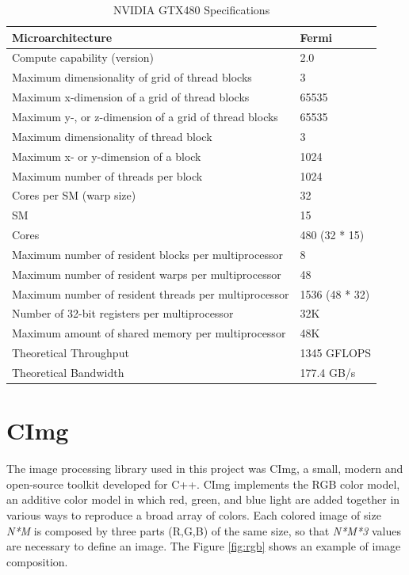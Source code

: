 \documentclass[a4paper]{article}
\begin{document}
\begin{table}[ht]
\centering
\begin{tabular}{l|l}
Microarchitecture & Fermi \\ \hline
Compute capability (version) & 2.0 \\ \hline
Maximum dimensionality of grid of thread blocks & 3 \\ \hline
Maximum x-dimension of a grid of thread blocks & 65535 \\ \hline
Maximum y-, or z-dimension of a grid of thread blocks & 65535 \\ \hline
Maximum dimensionality of thread block & 3 \\ \hline
Maximum x- or y-dimension of a block & 1024 \\ \hline
Maximum number of threads per block & 1024 \\ \hline
Cores per SM (warp size) & 32 \\ \hline
SM & 15 \\ \hline
Cores & 480 (32 * 15) \\ \hline
Maximum number of resident blocks per multiprocessor & 8 \\ \hline
Maximum number of resident warps per multiprocessor & 48 \\ \hline
Maximum number of resident threads per multiprocessor & 1536 (48 * 32) \\ \hline
Number of 32-bit registers per multiprocessor & 32K \\ \hline
Maximum amount of shared memory per multiprocessor & 48K \\ \hline
Theoretical Throughput & 1345 GFLOPS \\ \hline
Theoretical Bandwidth & 177.4 GB/s
\end{tabular}
\caption{NVIDIA GTX480 Specifications}
\label{table:t1}
\end{table}


\section{CImg}
\label{sec:cimg}
The image processing library used in this project was CImg, a small, modern and open-source toolkit developed for C++. CImg implements the RGB color model, an additive color model in which red, green, and blue light are added together in various ways to reproduce a broad array of colors. Each colored image of size \textit{N*M} is composed by three parts (R,G,B) of the same size, so that \textit{N*M*3} values are necessary to define an image. The Figure \ref{fig:rgb} shows an example of image composition.
\end{document}
